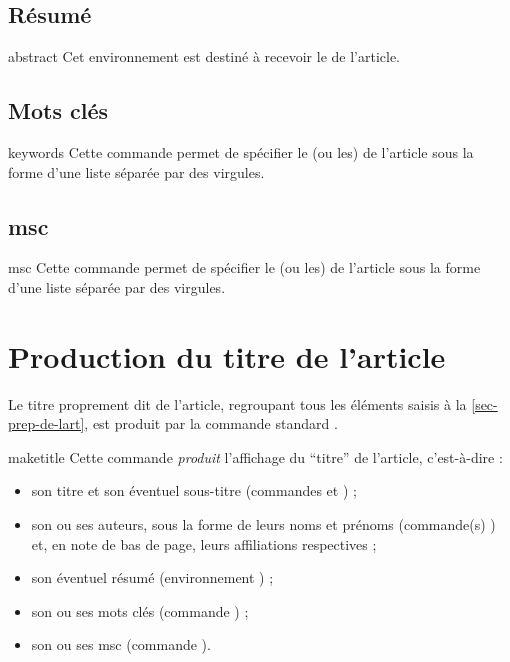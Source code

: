 \subsection{Résumé}
\label{sec-resume}

\begin{docEnvironment}[doc description=\mandatory,doclang/environment content=résumé]{abstract}{}
  Cet environnement est destiné à recevoir le  de l'article.
\end{docEnvironment}

\subsection{Mots clés}

\begin{docCommand}[doc description=\mandatory]{keywords}{}
  Cette commande permet de spécifier le (ou les)  de
  l'article sous la forme d'une liste séparée par des virgules.
\end{docCommand}

\subsection{\texorpdfstring{\acrfull{msc}}{MSC}}

\begin{docCommand}[doc description=\mandatory]{msc}{}
  Cette commande permet de spécifier le (ou les)  de
  l'article sous la forme d'une liste séparée par des virgules.
\end{docCommand}

\section{Production du titre de l'article}
\label{sec-creation-du-titre}

Le titre proprement dit de l'article, regroupant tous les éléments saisis à la
\vref{sec-prep-de-lart}, est produit par la commande standard
.

\begin{docCommand}[doc description=\mandatory]{maketitle}{}
  Cette commande \emph{produit} l'affichage du \enquote{titre} de l'article,
  c'est-à-dire :
  \begin{itemize}
  \item son titre et son éventuel sous-titre (commandes  et
    ) ;
  \item son ou ses auteurs, sous la forme de leurs noms et prénoms (commande(s)
    ) et, en note de bas de page, leurs affiliations respectives ;
  \item son éventuel résumé (environnement ) ;
  \item son ou ses mots clés (commande ) ;
  \item son ou ses \acrshort{msc} (commande ).
  \end{itemize}
\end{docCommand}

